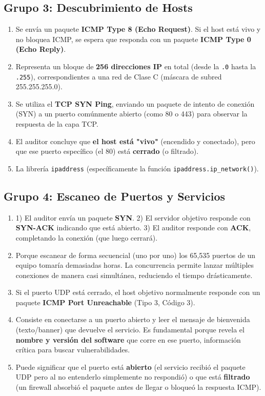 \documentclass[12pt,a4paper]{article}
\begin{document}
\subsection{Grupo 3: Descubrimiento de Hosts}
\begin{enumerate}[label=\textbf{\arabic*.}]
    \item Se envía un paquete \textbf{ICMP Type 8 (Echo Request)}. Si el host está vivo y no bloquea ICMP, se espera que responda con un paquete \textbf{ICMP Type 0 (Echo Reply)}.
    \item Representa un bloque de \textbf{256 direcciones IP} en total (desde la \texttt{.0} hasta la \texttt{.255}), correspondientes a una red de Clase C (máscara de subred 255.255.255.0).
    \item Se utiliza el \textbf{TCP SYN Ping}, enviando un paquete de intento de conexión (SYN) a un puerto comúnmente abierto (como 80 o 443) para observar la respuesta de la capa TCP.
    \item El auditor concluye que \textbf{el host está "vivo"} (encendido y conectado), pero que ese puerto específico (el 80) está \textbf{cerrado} (o filtrado).
    \item La librería \texttt{ipaddress} (específicamente la función \texttt{ipaddress.ip\_network()}).
\end{enumerate}

\subsection{Grupo 4: Escaneo de Puertos y Servicios}
\begin{enumerate}[label=\textbf{\arabic*.}]
    \item 1) El auditor envía un paquete \textbf{SYN}. 2) El servidor objetivo responde con \textbf{SYN-ACK} indicando que está abierto. 3) El auditor responde con \textbf{ACK}, completando la conexión (que luego cerrará).
    \item Porque escanear de forma secuencial (uno por uno) los 65,535 puertos de un equipo tomaría demasiadas horas. La concurrencia permite lanzar múltiples conexiones de manera casi simultánea, reduciendo el tiempo drásticamente.
    \item Si el puerto UDP está cerrado, el host objetivo normalmente responde con un paquete \textbf{ICMP Port Unreachable} (Tipo 3, Código 3).
    \item Consiste en conectarse a un puerto abierto y leer el mensaje de bienvenida (texto/banner) que devuelve el servicio. Es fundamental porque revela el \textbf{nombre y versión del software} que corre en ese puerto, información crítica para buscar vulnerabilidades.
    \item Puede significar que el puerto está \textbf{abierto} (el servicio recibió el paquete UDP pero al no entenderlo simplemente no respondió) o que está \textbf{filtrado} (un firewall absorbió el paquete antes de llegar o bloqueó la respuesta ICMP).
\end{enumerate}
\end{document}
